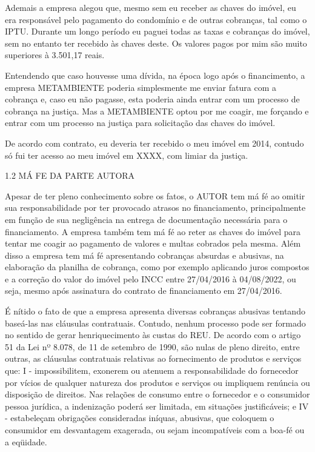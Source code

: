 \documentclass[11pt]{letter}
\begin{document}
Ademais a empresa alegou que, mesmo sem eu receber as chaves do imóvel, eu era responsável pelo pagamento do condomínio e de outras cobranças, tal como o IPTU. Durante um longo período eu paguei todas as taxas e cobranças do imóvel, sem no entanto ter recebido às chaves deste. Os valores pagos por mim são muito superiores à 3.501,17 reais.

Entendendo que caso houvesse uma dívida, na época logo após o financimento, a empresa METAMBIENTE poderia simplesmente me enviar fatura com a cobrança e, caso eu não pagasse, esta poderia ainda entrar com um processo de cobrança na justiça. Mas a METAMBIENTE optou por me coagir, me forçando e entrar com um processo na justiça para solicitação das chaves do imóvel.

De acordo com contrato, eu deveria ter recebido o meu imóvel em 2014, contudo só fui ter acesso ao meu imóvel em XXXX, com limiar da justiça. 

1.2 MÁ FE DA PARTE AUTORA

Apesar de ter pleno conhecimento sobre os fatos, o AUTOR tem má fé ao omitir sua responsabilidade por ter provocado atrasos no financiamento, principalmente em função de sua negligência na entrega de documentação necessária para o financiamento. A empresa também tem má fé ao reter as chaves do imóvel para tentar me coagir ao pagamento de valores e multas cobrados pela mesma. Além disso a empresa tem má fé apresentando cobranças absurdas e abusivas, na elaboração da planilha de cobrança, como por exemplo aplicando juros compostos e a correção do valor do imóvel pelo INCC entre 27/04/2016 à 04/08/2022, ou seja, mesmo após assinatura do contrato de financiamento em 27/04/2016.

É nítido o fato de que a empresa apresenta diversas cobranças abusivas tentando baseá-las nas cláusulas contratuais. Contudo, nenhum processo pode ser formado no sentido de gerar henriquecimento às custas do REU. De acordo com o artigo 51 da Lei nº 8.078, de 11 de setembro de 1990, são nulas de pleno direito, entre outras, as cláusulas contratuais relativas ao fornecimento de produtos e serviços que: I - impossibilitem, exonerem ou atenuem a responsabilidade do fornecedor por vícios de qualquer natureza dos produtos e serviços ou impliquem renúncia ou disposição de direitos. Nas relações de consumo entre o fornecedor e o consumidor pessoa jurídica, a indenização poderá ser limitada, em situações justificáveis; e IV - estabeleçam obrigações consideradas iníquas, abusivas, que coloquem o consumidor em desvantagem exagerada, ou sejam incompatíveis com a boa-fé ou a eqüidade. 
\end{document}
